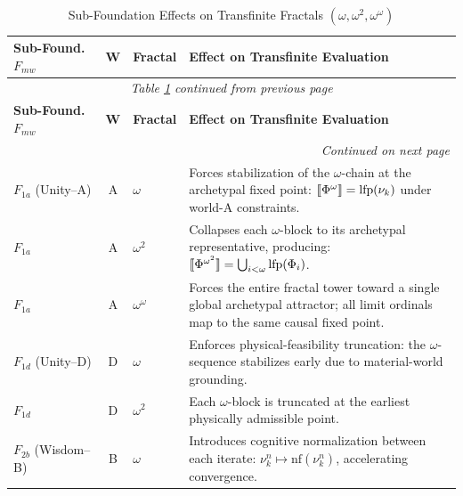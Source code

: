 \renewcommand{\arraystretch}{1.35}
\begin{longtable}{p{2.2cm}|c|p{1.5cm}|p{5.5cm}}
\caption{Sub-Foundation Effects on Transfinite Fractals $(\omega, \omega^2, \omega^\omega)$}
\label{tab:subfoundation-transfinite-fractals} \\
\toprule
\textbf{Sub-Found.\ $F_{mw}$}
& \textbf{W}
& \textbf{Fractal}
& \textbf{Effect on Transfinite Evaluation}
\\
\midrule
\endfirsthead
\multicolumn{4}{c}{\textit{Table \ref{tab:subfoundation-transfinite-fractals} continued from previous page}} \\
\toprule
\textbf{Sub-Found.\ $F_{mw}$}
& \textbf{W}
& \textbf{Fractal}
& \textbf{Effect on Transfinite Evaluation}
\\
\midrule
\endhead
\midrule
\multicolumn{4}{r}{\textit{Continued on next page}} \\
\endfoot
\bottomrule
\endlastfoot

$F_{1a}$ (Unity--A) & A & $\omega$
& Forces stabilization of the $\omega$-chain at the archetypal fixed point:
  $\llbracket \Phi^{\omega} \rrbracket = \operatorname{lfp}(\nu_k)$ under world-A constraints. \\

$F_{1a}$ & A & $\omega^2$
& Collapses each $\omega$-block to its archetypal representative, producing:
  $\llbracket \Phi^{\omega^2} \rrbracket = \bigcup_{i < \omega} \operatorname{lfp}(\Phi_i)$. \\

$F_{1a}$ & A & $\omega^\omega$
& Forces the entire fractal tower toward a single global archetypal attractor;
  all limit ordinals map to the same causal fixed point. \\

\midrule

$F_{1d}$ (Unity--D) & D & $\omega$
& Enforces physical-feasibility truncation:
  the $\omega$-sequence stabilizes early due to material-world grounding. \\

$F_{1d}$ & D & $\omega^2$
& Each $\omega$-block is truncated at the earliest physically admissible point. \\

\midrule

$F_{2b}$ (Wisdom--B) & B & $\omega$
& Introduces cognitive normalization between each iterate:
  $\nu_k^n \mapsto \mathrm{nf}(\nu_k^n)$, accelerating convergence. \\


\end{longtable}
